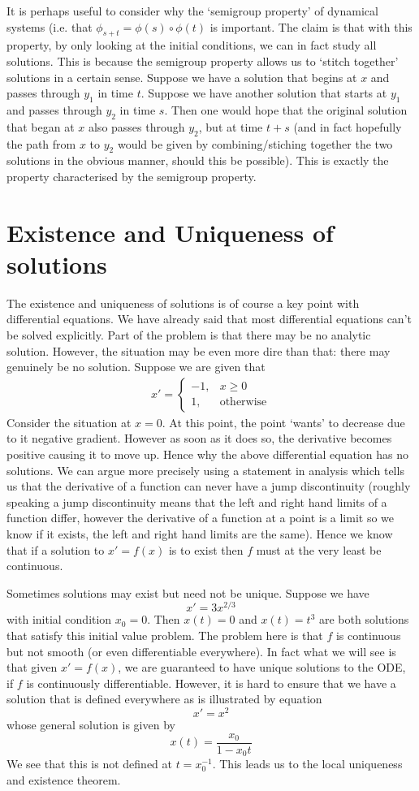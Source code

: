 It is perhaps useful to consider why the `semigroup property' of dynamical systems (i.e. that $\phi_{s + t} = \phi(s) \circ \phi(t)$ is important. The claim is that with this property, by only looking at the initial conditions, we can in fact study all solutions. This is because the semigroup property allows us to `stitch together' solutions in a certain sense. Suppose we have a solution that begins at $x$ and passes through $y_1$ in time $t$. Suppose we have another solution that starts at $y_1$ and passes through $y_2$ in time $s$. Then one would hope that the original solution that began at $x$ also passes through $y_2$, but at time $t + s$ (and in fact hopefully the path from $x$ to $y_2$ would be given by combining/stiching together the two solutions in the obvious manner, should this be possible). This is exactly the property characterised by the semigroup property.


\section{Existence and Uniqueness of solutions}
The existence and uniqueness of solutions is of course a key point with differential equations. We have already said that most differential equations can't be solved explicitly. Part of the problem is that there may be no analytic solution. However, the situation may be even more dire than that: there may genuinely be no solution. Suppose we are given that
\begin{align*}
    x' = \begin{cases}
    -1, & x \geq 0\\
    1, & \text{otherwise}
    \end{cases}
\end{align*}
Consider the situation at $x = 0$. At this point, the point `wants' to decrease due to it negative gradient. However as soon as it does so, the derivative becomes positive causing it to move up. Hence why the above differential equation has no solutions. We can argue more precisely using a statement in analysis which tells us that the derivative of a function can never have a jump discontinuity (roughly speaking a jump discontinuity means that the left and right hand limits of a function differ, however the derivative of a function at a point is a limit so we know if it exists, the left and right hand limits are the same). Hence we know that if a solution to $x' = f(x)$ is to exist then $f$ must at the very least be continuous.

Sometimes solutions may exist but need not be unique. Suppose we have
$$x' = 3x^{2/3}$$
with initial condition $x_0 = 0$. Then $x(t) = 0$ and $x(t) = t^3$ are both solutions that satisfy this initial value problem. The problem here is that $f$ is continuous but not smooth (or even differentiable everywhere). In fact what we will see is that given $x' = f(x)$, we are guaranteed to have unique solutions to the ODE, if $f$ is continuously differentiable. However, it is hard to ensure that we have a solution that is defined everywhere as is illustrated by equation
$$x' = x^2$$
whose general solution is given by
$$x(t) = \frac{x_0}{1 - x_0 t}$$
We see that this is not defined at $t = x_0^{-1}$. This leads us to the local uniqueness and existence theorem.

